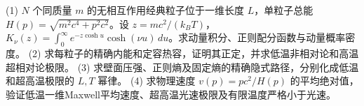 (1) \(N\) 个同质量 \(m\) 的无相互作用经典粒子位于一维长度 \(L\)，单粒子总能 \(H(p)=\sqrt{m^2c^4+p^2c^2}\)。设 \(z=mc^2/(k_BT)\)，\(K_\nu(z)=\int_0^\infty e^{-z\cosh u}\cosh(\nu u)\,du\)。求动量积分、正则配分函数与动量概率密度。
(2) 求每粒子的精确内能和定容热容，证明其正定，并求低温非相对论和高温超相对论极限。
(3) 求壁面压强、正则熵及固定熵的精确隐式路径，分别化成低温和超高温极限的 \(L,T\) 幂律。
(4) 求物理速度 \(v(p)=pc^2/H(p)\) 的平均绝对值，验证低温一维Maxwell平均速度、超高温光速极限及有限温度严格小于光速。
